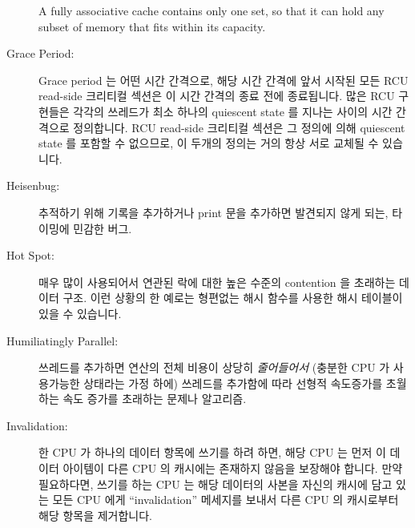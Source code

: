 \begin{description}
	A fully associative cache contains only
	one set, so that it can hold any subset of
	memory that fits within its capacity.
	\fi
\item[Grace Period:]
	Grace period 는 어떤 시간 간격으로, 해당 시간 간격에 앞서 시작된 모든
	RCU read-side 크리티컬 섹션은 이 시간 간격의 종료 전에 종료됩니다.
	많은 RCU 구현들은 각각의 쓰레드가 최소 하나의 quiescent state 를 지나는
	사이의 시간 간격으로 정의합니다.
	RCU read-side 크리티컬 섹션은 그 정의에 의해 quiescent state 를 포함할
	수 없으므로, 이 두개의 정의는 거의 항상 서로 교체될 수 있습니다.
	\iffalse

	A grace period is any contiguous time interval such that
	any RCU read-side critical section that began before the
	start of that interval has
	completed before the end of that same interval.
	Many RCU implementations define a grace period to be a
	time interval during which each thread has passed through at
	least one quiescent state.
	Since RCU read-side critical sections by definition cannot
	contain quiescent states, these two definitions are almost
	always interchangeable.
	\fi
\item[Heisenbug:]
	추적하기 위해 기록을 추가하거나 print 문을 추가하면 발견되지 않게 되는,
	타이밍에 민감한 버그.
	\iffalse

	A timing-sensitive bug that disappears from sight when you
	add print statements or tracing in an attempt to track it
	down.
	\fi
\item[Hot Spot:]
	매우 많이 사용되어서 연관된 락에 대한 높은 수준의 contention 을
	초래하는 데이터 구조.
	이런 상황의 한 예로는 형편없는 해시 함수를 사용한 해시 테이블이 있을 수
	있습니다.
	\iffalse

	Data structure that is very heavily used, resulting in high
	levels of contention on the corresponding lock.
	One example of this situation would be a hash table with
	a poorly chosen hash function.
	\fi
\item[Humiliatingly Parallel:]
	쓰레드를 추가하면 연산의 전체 비용이 상당히 \emph{줄어들어서} (충분한
	CPU 가 사용가능한 상태라는 가정 하에) 쓰레드를 추가함에 따라 선형적
	속도증가를 초월하는 속도 증가를 초래하는 문제나 알고리즘.
	\iffalse

	A problem or algorithm where adding threads significantly
	\emph{decreases} the overall cost of the computation, resulting in
	large superlinear speedups as threads are added (assuming sufficient
	CPUs are available).
	\fi
\item[Invalidation:]
	한 CPU 가 하나의 데이터 항목에 쓰기를 하려 하면, 해당 CPU 는 먼저 이
	데이터 아이템이 다른 CPU 의 캐시에는 존재하지 않음을 보장해야 합니다.
	만약 필요하다면, 쓰기를 하는 CPU 는 해당 데이터의 사본을 자신의 캐시에
	담고 있는 모든 CPU 에게 ``invalidation'' 메세지를 보내서 다른 CPU 의
	캐시로부터 해당 항목을 제거합니다.
	\iffalse


\end{description}
